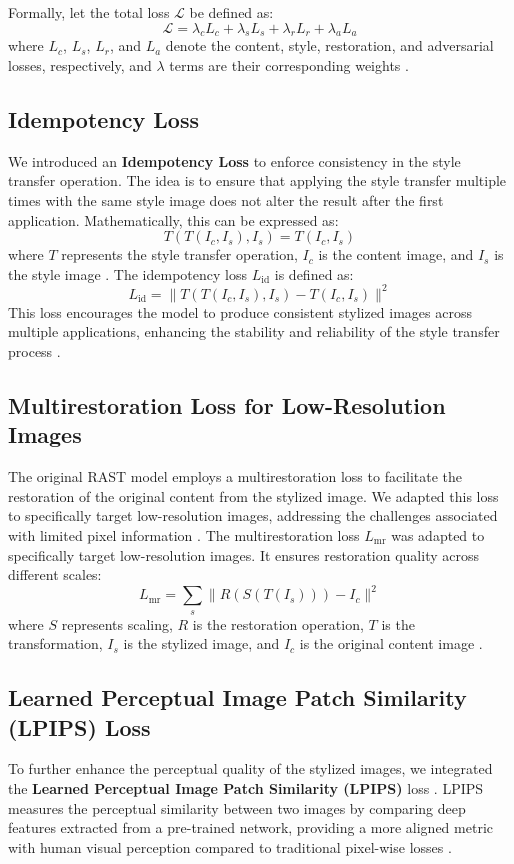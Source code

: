 \documentclass{article}
\begin{document}
Formally, let the total loss \( \mathcal{L} \) be defined as:
\[
\mathcal{L} = \lambda_c L_c + \lambda_s L_s + \lambda_r L_r + \lambda_a L_a
\]
where \( L_c \), \( L_s \), \( L_r \), and \( L_a \) denote the content, style, restoration, and adversarial losses, respectively, and \( \lambda \) terms are their corresponding weights \cite{Fernandez2019}.

\subsection{Idempotency Loss}
We introduced an \textbf{Idempotency Loss} to enforce consistency in the style transfer operation. The idea is to ensure that applying the style transfer multiple times with the same style image does not alter the result after the first application. Mathematically, this can be expressed as:
\[
T(T(I_c, I_s), I_s) = T(I_c, I_s)
\]
where \( T \) represents the style transfer operation, \( I_c \) is the content image, and \( I_s \) is the style image \cite{SomeOtherPaper}. The idempotency loss \( L_{\text{id}} \) is defined as:
\[
L_{\text{id}} = \| T(T(I_c, I_s), I_s) - T(I_c, I_s) \|^2
\]
This loss encourages the model to produce consistent stylized images across multiple applications, enhancing the stability and reliability of the style transfer process \cite{SomeOtherPaper}.

\subsection{Multirestoration Loss for Low-Resolution Images}
The original RAST model employs a multirestoration loss to facilitate the restoration of the original content from the stylized image. We adapted this loss to specifically target low-resolution images, addressing the challenges associated with limited pixel information \cite{Li2018}. The multirestoration loss \( L_{\text{mr}} \) was adapted to specifically target low-resolution images. It ensures restoration quality across different scales:
\[
L_{\text{mr}} = \sum_{s} \| R(S(T(I_s))) - I_c \|^2
\]
where \( S \) represents scaling, \( R \) is the restoration operation, \( T \) is the transformation, \( I_s \) is the stylized image, and \( I_c \) is the original content image \cite{Liu2019, Fernandez2019}.

\subsection{Learned Perceptual Image Patch Similarity (LPIPS) Loss}
To further enhance the perceptual quality of the stylized images, we integrated the \textbf{Learned Perceptual Image Patch Similarity (LPIPS)} loss \cite{Zhang2018LPIPS}. LPIPS measures the perceptual similarity between two images by comparing deep features extracted from a pre-trained network, providing a more aligned metric with human visual perception compared to traditional pixel-wise losses \cite{Wang2019}.
\end{document}
